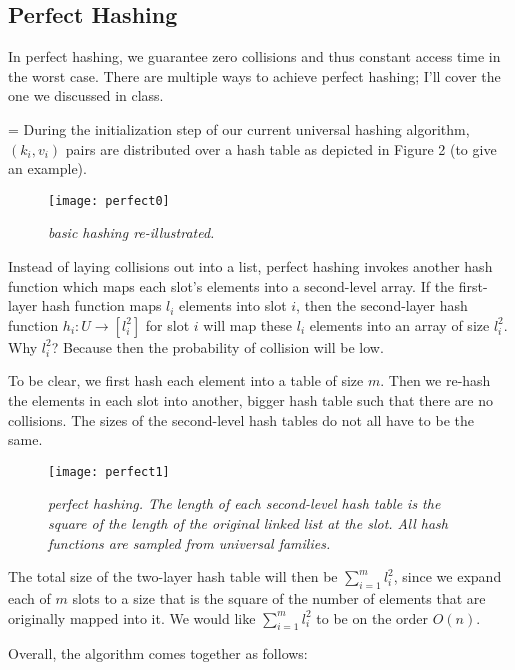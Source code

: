 \documentclass[11pt]{article}
\begin{document}
\subsection*{Perfect Hashing}

In perfect hashing, we guarantee zero collisions and thus constant access time in the worst case. There are multiple ways to achieve perfect hashing; I'll cover the one we discussed in class.

{\parskip=\baselineskip
During the initialization step of our current universal hashing algorithm, $(k_i, v_i)$ pairs are distributed over a hash table as depicted in Figure 2 (to give an example).

\begin{figure}[H]
\centering
\texttt{[image: perfect0]}
\caption{\textit{basic hashing re-illustrated.}}
\end{figure}
\vspace*{-5mm}

Instead of laying collisions out into a list, perfect hashing invokes another hash function which maps each slot's elements into a second-level array. If the first-layer hash function maps $l_i$ elements into slot $i$, then the second-layer hash function $h_i: U \to [l_i^2]$ for slot $i$ will map these $l_i$ elements into an array of size $l_i^2$. Why $l_i^2$? Because then the probability of collision will be low.

To be clear, we first hash each element into a table of size $m$. Then we re-hash the elements in each slot into another, bigger hash table such that there are no collisions. The sizes of the second-level hash tables do not all have to be the same.

\begin{figure}[H]
\centering
\texttt{[image: perfect1]}
\caption{\textit{perfect hashing. The length of each second-level hash table is the square of the length of the original linked list at the slot. All hash functions are sampled from universal families.}}
\end{figure}
\vspace*{-5mm}

The total size of the two-layer hash table will then be $\sum_{i = 1}^m l_i^2$, since we expand each of $m$ slots to a size that is the square of the number of elements that are originally mapped into it. We would like $\sum_{i = 1}^m l_i^2$ to be on the order $O(n)$.

Overall, the algorithm comes together as follows:

}
\end{document}
